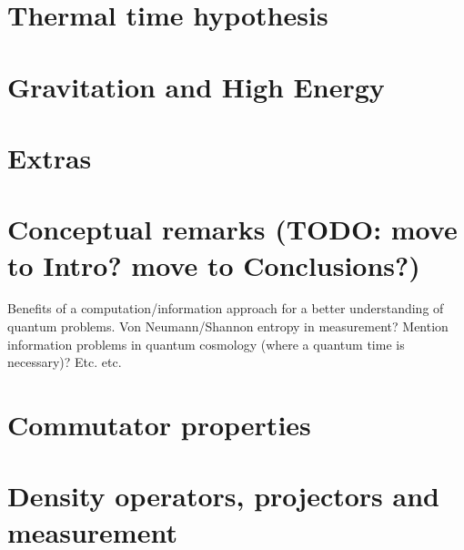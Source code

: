 \chapter{Thermal time hypothesis}


\chapter{Gravitation and High Energy}



\chapter{Extras}


\chapter{Conceptual remarks (TODO: move to Intro? move to Conclusions?)}
Benefits of a computation/information approach for a better understanding of quantum
problems. Von Neumann/Shannon entropy in measurement? Mention information problems
in quantum cosmology (where a quantum time is necessary)? Etc. etc.

\appendix
\chapter{Commutator properties}

\chapter{Density operators, projectors and measurement}


\printbibliography[heading=bibintoc]


